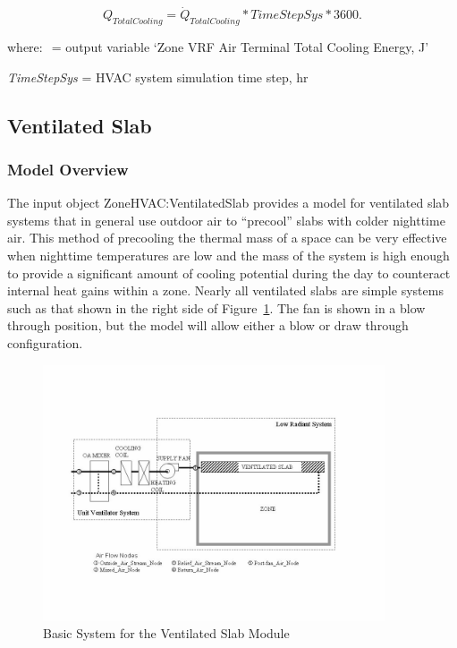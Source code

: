 \begin{equation}
{Q_{TotalCooling}} = {\dot Q_{TotalCooling}}*TimeStepSys*3600.
\end{equation}

where: \(_{ }\) = output variable `Zone VRF Air Terminal Total Cooling Energy, J'

\emph{TimeStepSys} = HVAC system simulation time step, hr

\subsection{Ventilated Slab}\label{ventilated-slab}

\subsubsection{Model Overview}\label{model-overview}

The input object ZoneHVAC:VentilatedSlab provides a model for ventilated slab systems that in general use outdoor air to ``precool'' slabs with colder nighttime air. This method of precooling the thermal mass of a space can be very effective when nighttime temperatures are low and the mass of the system is high enough to provide a significant amount of cooling potential during the day to counteract internal heat gains within a zone. Nearly all ventilated slabs are simple systems such as that shown in the right side of Figure~\ref{fig:basic-system-for-the-ventilated-slab-module}. The fan is shown in a blow through position, but the model will allow either a blow or draw through configuration.

\begin{figure}[hbtp] %
\centering
\includegraphics[width=0.9\textwidth, height=0.9\textheight, keepaspectratio=true]{media/image7396.png}
\caption{Basic System for the Ventilated Slab Module \protect \label{fig:basic-system-for-the-ventilated-slab-module}}
\end{figure}

